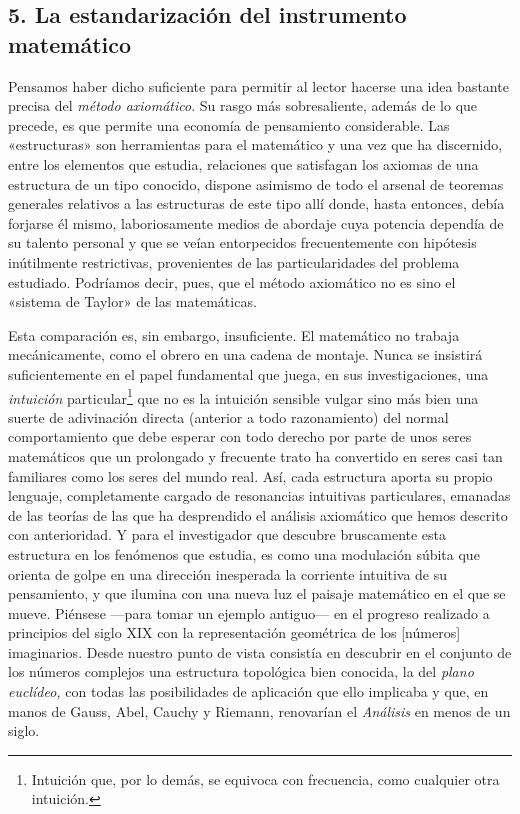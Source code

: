 \documentclass[a4paper, 12pt, draft]{article}
\begin{document}
\subsection*{5. La estandarización del instrumento matemático}

Pensamos haber dicho suficiente para permitir al lector hacerse una idea bastante precisa del \textit{método axiomático}. Su rasgo más sobresaliente, además de lo que precede, es que permite una economía de pensamiento considerable. Las «estructuras» son herramientas para el matemático y una vez que ha discernido, entre los elementos que estudia, relaciones que satisfagan los axiomas de una estructura de un tipo conocido, dispone asimismo de todo el arsenal de teoremas generales relativos a las estructuras de este tipo allí donde, hasta entonces, debía forjarse él mismo, laboriosamente medios de abordaje cuya potencia dependía de su talento personal y que se veían entorpecidos frecuentemente con hipótesis inútilmente restrictivas, provenientes de las particularidades del problema estudiado. Podríamos decir, pues, que el método axiomático no es sino el «sistema de Taylor» de las matemáticas. 

Esta comparación es, sin embargo, insuficiente. El matemático no trabaja mecánicamente, como el obrero en una cadena de montaje. Nunca se insistirá suficientemente en el papel fundamental que juega, en sus investigaciones, una \textit{intuición} particular\footnote{Intuición que, por lo demás, se equivoca con frecuencia, como cualquier otra intuición.} que no es la intuición sensible vulgar sino más bien una suerte de adivinación directa (anterior a todo razonamiento) del normal comportamiento que debe esperar con todo derecho por parte de unos seres matemáticos que un prolongado y frecuente trato ha convertido en seres casi tan familiares como los seres del mundo real. Así, cada estructura aporta su propio lenguaje, completamente cargado de resonancias intuitivas particulares, emanadas de las teorías de las que ha desprendido el análisis axiomático que hemos descrito con anterioridad. Y para el investigador que descubre bruscamente esta estructura en los fenómenos que estudia, es como una modulación súbita que orienta de golpe en una dirección inesperada la corriente intuitiva de su pensamiento, y que ilumina con una nueva luz el paisaje matemático en el que se mueve. Piénsese ---para tomar un ejemplo antiguo--- en el progreso realizado a principios del siglo XIX con la representación geométrica de los [números] imaginarios. Desde nuestro punto de vista consistía en descubrir en el conjunto de los números complejos una estructura topológica bien conocida, la del \textit{plano euclídeo,} con todas las posibilidades de aplicación que ello implicaba y que, en manos de Gauss, Abel, Cauchy y Riemann, renovarían el \textit{Análisis} en menos de un siglo. 
\end{document}
